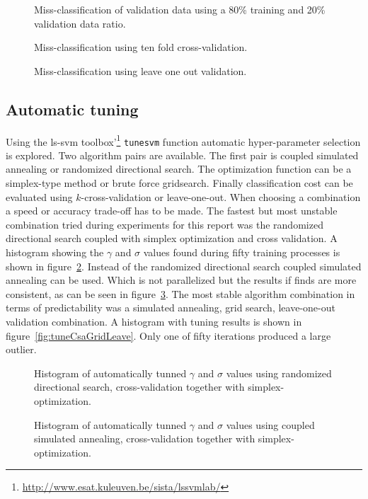 \begin{figure}
\centering

\caption{Miss-classification of validation data using a 80\% training and 20\% validation data ratio.}
\label{fig:classicClass}

\caption{Miss-classification using ten fold cross-validation.}
\label{fig:crossClass}

\caption{Miss-classification using leave one out validation.}
\label{fig:looClass}
\end{figure}

\subsection{Automatic tuning}
Using the ls-svm toolbox'\footnote{\url{http://www.esat.kuleuven.be/sista/lssvmlab/}} \texttt{tunesvm} function automatic hyper-parameter selection is explored. Two algorithm pairs are available. The first pair is coupled simulated annealing or randomized directional search. The optimization function can be a simplex-type method or brute force gridsearch. Finally classification cost can be evaluated using $k$-cross-validation or leave-one-out. When choosing a combination a speed or accuracy trade-off has to be made. The fastest but most unstable combination tried during experiments for this report was the randomized directional search coupled with simplex optimization and cross validation. A histogram showing the $\gamma$ and $\sigma$ values found during fifty training processes is shown in figure~\ref{fig:tuneDsSimplexCrossv}.
Instead of the randomized directional search coupled simulated annealing can be used. Which is not parallelized but the results if finds are more consistent, as can be seen in figure~\ref{fig:tuneCsaSimplexCrossv}. The most stable algorithm combination in terms of predictability was a simulated annealing, grid search, leave-one-out validation combination. A histogram with tuning results is shown in figure~\ref{fig:tuneCsaGridLeave}. Only one of fifty iterations produced a large outlier. 


\begin{figure}
\centering


\caption{Histogram of automatically tunned  $\gamma$ and $\sigma$ values using randomized directional search, cross-validation together with simplex-optimization.}
\label{fig:tuneDsSimplexCrossv}
\end{figure}
\begin{figure}
\centering


\caption{Histogram of automatically tunned  $\gamma$ and $\sigma$ values using coupled simulated annealing, cross-validation together with simplex-optimization.}
\label{fig:tuneCsaSimplexCrossv}
\end{figure}

